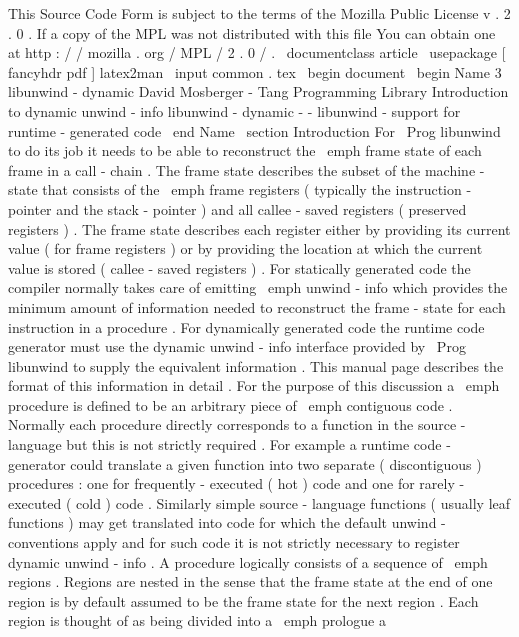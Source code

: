 %
This
Source
Code
Form
is
subject
to
the
terms
of
the
Mozilla
Public
%
License
v
.
2
.
0
.
If
a
copy
of
the
MPL
was
not
distributed
with
this
%
file
You
can
obtain
one
at
http
:
/
/
mozilla
.
org
/
MPL
/
2
.
0
/
.
\
documentclass
{
article
}
\
usepackage
[
fancyhdr
pdf
]
{
latex2man
}
\
input
{
common
.
tex
}
\
begin
{
document
}
\
begin
{
Name
}
{
3
}
{
libunwind
-
dynamic
}
{
David
Mosberger
-
Tang
}
{
Programming
Library
}
{
Introduction
to
dynamic
unwind
-
info
}
libunwind
-
dynamic
-
-
libunwind
-
support
for
runtime
-
generated
code
\
end
{
Name
}
\
section
{
Introduction
}
For
\
Prog
{
libunwind
}
to
do
its
job
it
needs
to
be
able
to
reconstruct
the
\
emph
{
frame
state
}
of
each
frame
in
a
call
-
chain
.
The
frame
state
describes
the
subset
of
the
machine
-
state
that
consists
of
the
\
emph
{
frame
registers
}
(
typically
the
instruction
-
pointer
and
the
stack
-
pointer
)
and
all
callee
-
saved
registers
(
preserved
registers
)
.
The
frame
state
describes
each
register
either
by
providing
its
current
value
(
for
frame
registers
)
or
by
providing
the
location
at
which
the
current
value
is
stored
(
callee
-
saved
registers
)
.
For
statically
generated
code
the
compiler
normally
takes
care
of
emitting
\
emph
{
unwind
-
info
}
which
provides
the
minimum
amount
of
information
needed
to
reconstruct
the
frame
-
state
for
each
instruction
in
a
procedure
.
For
dynamically
generated
code
the
runtime
code
generator
must
use
the
dynamic
unwind
-
info
interface
provided
by
\
Prog
{
libunwind
}
to
supply
the
equivalent
information
.
This
manual
page
describes
the
format
of
this
information
in
detail
.
For
the
purpose
of
this
discussion
a
\
emph
{
procedure
}
is
defined
to
be
an
arbitrary
piece
of
\
emph
{
contiguous
}
code
.
Normally
each
procedure
directly
corresponds
to
a
function
in
the
source
-
language
but
this
is
not
strictly
required
.
For
example
a
runtime
code
-
generator
could
translate
a
given
function
into
two
separate
(
discontiguous
)
procedures
:
one
for
frequently
-
executed
(
hot
)
code
and
one
for
rarely
-
executed
(
cold
)
code
.
Similarly
simple
source
-
language
functions
(
usually
leaf
functions
)
may
get
translated
into
code
for
which
the
default
unwind
-
conventions
apply
and
for
such
code
it
is
not
strictly
necessary
to
register
dynamic
unwind
-
info
.
A
procedure
logically
consists
of
a
sequence
of
\
emph
{
regions
}
.
Regions
are
nested
in
the
sense
that
the
frame
state
at
the
end
of
one
region
is
by
default
assumed
to
be
the
frame
state
for
the
next
region
.
Each
region
is
thought
of
as
being
divided
into
a
\
emph
{
prologue
}
a
\
